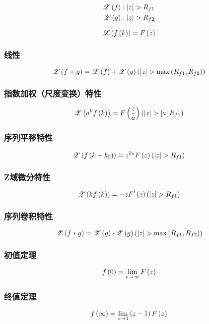 \documentclass{article}
\begin{document}
\[\begin{aligned}
        \ztrans{f} & :\abs{z}>R_{f1} \\
        \ztrans{g} & :\abs{z}>R_{f2}
    \end{aligned}\]

\[\mathscr Z\left(f\left(k\right)\right)=F\left(z\right)\]

\subsubsection{线性}

\[\ztrans{f+g}=\ztrans{f}+\ztrans{g}\pare{\abs{z}>\max\pare{{R_{f1},R_{f2}}}}\]

\subsubsection{指数加权（尺度变换）特性}

\[\ztrans{a^k\fk}=F\pare{\frac za}\pare{\abs z>\abs aR_{f1}}\]

\subsubsection{序列平移特性}

\[\ztrans{f\pare{k+k_0}}=z^{k_0}\fz\pare{\abs{z}>R_{f1}}\]

\subsubsection{Z域微分特性}

\[\ztrans{k\fk}=-zF^\prime\pare{z}\pare{\abs{z}>R_{f1}}\]

\subsubsection{序列卷积特性}

\[\ztrans{f\ast g}=\ztrans{g}\cdot\ztrans{g}\pare{\abs{z}>\max\pare{{R_{f1},R_{f2}}}}\]

\subsubsection{初值定理}

\[f\left(0\right)=\lim_{z\to\infty}F\left(z\right)\]

\subsubsection{终值定理}

\[f\left(\infty\right)=\lim_{z\to1}\left(z-1\right)F\left(z\right)\]
\end{document}
